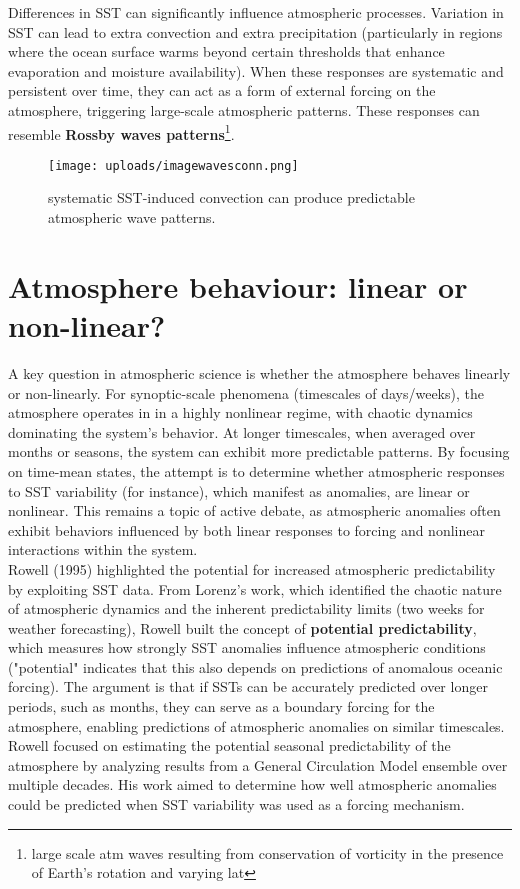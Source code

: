 Differences in SST can significantly influence atmospheric processes. Variation in SST can lead to extra convection and extra precipitation (particularly in regions where the ocean surface warms beyond certain thresholds that enhance evaporation and moisture availability). When these responses are systematic and persistent over time, they can act as a form of external forcing on the atmosphere, triggering large-scale atmospheric patterns. These responses can resemble \textbf{Rossby waves patterns}\footnote{large scale atm waves resulting from conservation of vorticity in the presence of Earth's rotation and varying lat}.

\begin{figure}[htpb]
	\centering
	\texttt{[image: uploads/imagewavesconn.png]}
	\caption{systematic SST-induced convection can produce predictable atmospheric wave patterns.}

\end{figure}
\section{Atmosphere behaviour: linear or non-linear?}
A key question in atmospheric science is whether the atmosphere behaves linearly or non-linearly. For synoptic-scale phenomena (timescales of days/weeks), the atmosphere operates in in a highly nonlinear regime, with chaotic dynamics dominating the system's behavior. At longer timescales, when averaged over months or seasons, the system can exhibit more predictable patterns. By focusing on time-mean states, the attempt is to determine whether atmospheric responses to SST variability (for instance), which manifest as anomalies, are linear or nonlinear. This remains a topic of active debate, as atmospheric anomalies often exhibit behaviors influenced by both linear responses to forcing and nonlinear interactions within the system.
\\[0.2 cm]

Rowell (1995)\cite{Rowell1995} highlighted the potential for increased atmospheric predictability by exploiting SST data. From Lorenz's work, which identified the chaotic nature of atmospheric dynamics and the inherent predictability limits (two weeks for weather forecasting), Rowell built the concept of \textbf{potential predictability}, which measures how strongly SST anomalies influence atmospheric conditions ("potential" indicates that this also depends on predictions of
anomalous oceanic forcing). The argument is that if SSTs can be accurately predicted over longer periods, such as months, they can serve as a boundary forcing for the atmosphere, enabling predictions of atmospheric anomalies on similar timescales. \\
Rowell focused on estimating the potential seasonal predictability of the atmosphere by analyzing results from a General Circulation Model ensemble over multiple decades. His work aimed to determine how well atmospheric anomalies could be predicted when SST variability was used as a forcing mechanism. \\



